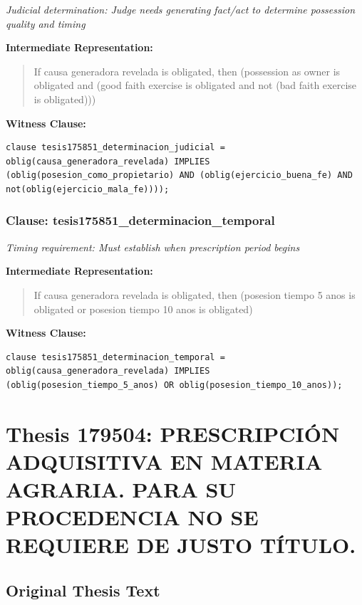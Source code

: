 \documentclass[11pt,a4paper]{article}
\begin{document}
\textit{Judicial determination: Judge needs generating fact/act to determine possession quality and timing}

\textbf{Intermediate Representation:}

\begin{quote}
If causa generadora revelada is obligated, then (possession as owner is obligated and (good faith exercise is obligated and not (bad faith exercise is obligated)))
\end{quote}

\textbf{Witness Clause:}

\begin{lstlisting}[style=witnessstyle, language=Witness]
clause tesis175851_determinacion_judicial = oblig(causa_generadora_revelada) IMPLIES (oblig(posesion_como_propietario) AND (oblig(ejercicio_buena_fe) AND not(oblig(ejercicio_mala_fe))));
\end{lstlisting}

\subsubsection{Clause: tesis175851\_determinacion\_temporal}

\textit{Timing requirement: Must establish when prescription period begins}

\textbf{Intermediate Representation:}

\begin{quote}
If causa generadora revelada is obligated, then (posesion tiempo 5 anos is obligated or posesion tiempo 10 anos is obligated)
\end{quote}

\textbf{Witness Clause:}

\begin{lstlisting}[style=witnessstyle, language=Witness]
clause tesis175851_determinacion_temporal = oblig(causa_generadora_revelada) IMPLIES (oblig(posesion_tiempo_5_anos) OR oblig(posesion_tiempo_10_anos));
\end{lstlisting}

\newpage

\section{Thesis 179504: PRESCRIPCIÓN ADQUISITIVA EN MATERIA AGRARIA. PARA SU PROCEDENCIA NO SE REQUIERE DE JUSTO TÍTULO.}
\label{thesis:179504}

\subsection{Original Thesis Text}
\end{document}
